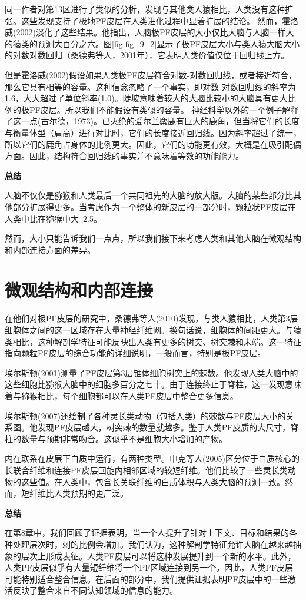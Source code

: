 \par
同一作者对第13区进行了类似的分析，发现与其他类人猿相比，人类没有这种扩张。这些发现支持了极地PF皮层在人类进化过程中显着扩展的结论。
然而，霍洛威(2002)淡化了这些结果。他指出，人脑极PF皮层的大小仅比大脑与人脑一样大的猿类的预测大百分之六。图\ref{fig:fig_9_2}显示了极PF皮层大小与类人猿大脑大小的对数对数回归（桑德弗等人，2001年），它表明人类价值仅位于回归线上方。
\par
但是霍洛威(2002)假设如果人类极PF皮层符合对数-对数回归线，或者接近符合，那么它具有相等的容量。这种信念忽略了一个事实，即对数-对数回归线的斜率为1.6，大大超过了单位斜率(1.0)。陡坡意味着较大的大脑比较小的大脑具有更大比例的极PF皮层。所以我们不能假设有类似的容量。
神经科学以外的一个例子解释了这一点(古尔德，1973)。已灭绝的爱尔兰麋鹿有巨大的鹿角，但当将它们的长度与衡量体型（肩高）进行对比时，它们的长度接近回归线。因为斜率超过了统一，所以它们的鹿角占身体的比例更大。因此，它们的功能更有效，大概是在吸引配偶方面。因此，结构符合回归线的事实并不意味着等效的功能能力。
\par
\textbf{总结}
\par
人脑不仅仅是猕猴和人类最后一个共同祖先的大脑的放大版。大脑的某些部分比其他部分扩展得更多。当考虑作为一个整体的新皮层的一部分时，颗粒状PF皮层在人类中比在猕猴中大~2.5。
\par
然而，大小只能告诉我们一点点，所以我们接下来考虑人类和其他大脑在微观结构和内部连接方面的差异。
\section{微观结构和内部连接}
在他们对极PF皮层的研究中，桑德弗等人(2010)发现，与类人猿相比，人类第3层细胞体之间的这一区域存在大量神经纤维网。换句话说，细胞体的间距更大。与猿类相比，这种解剖学特征可能反映出人类有更多的树突、树突棘和末端。这一特征指向颗粒PF皮层的综合功能的详细说明，一般而言，特别是极PF皮层。
\par
埃尔斯顿(2001)测量了PF皮层第3层锥体细胞树突上的棘数。他发现人类大脑中的这些细胞比猕猴大脑中的细胞多百分之七十。由于连接终止于脊柱，这一发现意味着与猕猴相比，每个细胞都可以在人类PF皮层中整合更多信息。
\par
埃尔斯顿(2007)还绘制了各种灵长类动物（包括人类）的棘数与PF皮层大小的关系图。他发现PF皮层越大，树突棘的数量就越多。鉴于人类PF皮质的大尺寸，脊柱的数量与预期非常吻合。这似乎不是细胞大小增加的产物。
\par
内在联系在皮层下白质中运行，有两种类型。申克等人(2005)区分位于白质核心的长联合纤维和连接PF皮层回旋内相邻区域的较短纤维。他们比较了一些灵长类动物的这些值。在人类中，包含长关联纤维的白质体积与人类大脑的预测一致。然而，短纤维比人类预期的更广泛。
\par
\textbf{总结}
\par
在第8章中，我们回顾了证据表明，当一个人提升了针对上下文、目标和结果的各种处理层次时，刺的比例会增加。我们认为，这种解剖学特征允许大脑在越来越抽象的层次上形成表征。人类PF皮层可以将这种发展提升到一个新的水平。此外，人类PF皮层似乎有大量短纤维将一个PF区域连接到另一个。因此，人类PF皮层可能特别适合整合信息。在后面的部分中，我们提供证据表明PF皮层中的一些激活反映了整合来自不同认知领域的信息的能力。
